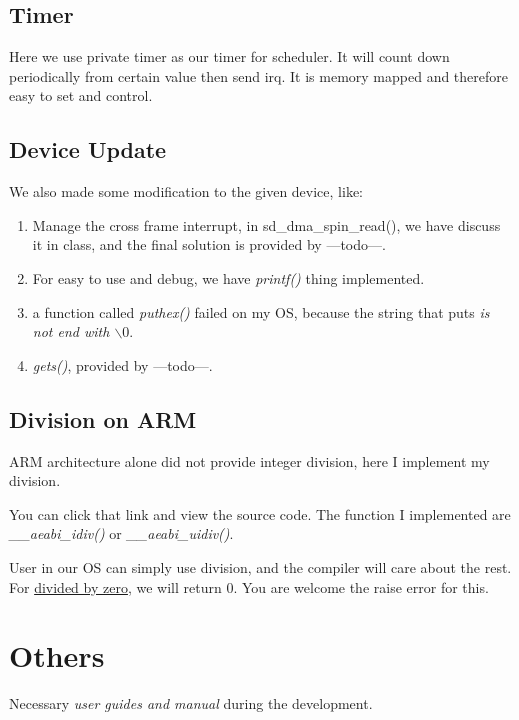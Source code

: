 \documentclass{article}
\begin{document}
\subsection{Timer}

Here we use private timer as our timer for scheduler. It will count down periodically from certain value then send irq. It is memory mapped and therefore easy to set and control.

\subsection{Device Update}

We also made some modification to the given device, like:

\begin{enumerate}
	\item	Manage the cross frame interrupt, in sd\_dma\_spin\_read(), we have discuss it in class, and the final solution is provided by ---todo---.
	\item	For easy to use and debug, we have \emph{printf()} thing implemented.
	\item a function called \emph{puthex()} failed on my OS, because the string that puts \emph{is not end with $\backslash 0$}.
	\item \emph{gets()}, provided by ---todo---.
\end{enumerate}

\subsection{Division on ARM}

ARM architecture alone did not provide integer division, here I implement my division.\cite{---todo---}

You can click that link and view the source code. The function I implemented are \emph{\_\_aeabi\_idiv()} or \emph{\_\_aeabi\_uidiv()}.

User in our OS can simply use division, and the compiler will care about the rest. For \underline{divided by zero}, we will return 0. You are welcome the raise error for this.

\section{Others}

Necessary \emph{user guides and manual} during the development.
\end{document}
